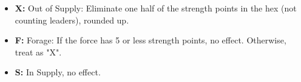 \begin{minipage}{\columnwidth}
  \begin{itemize}
    \item \textbf{X:} Out of Supply: Eliminate one half of the strength points in the hex (not counting leaders), rounded up.
    \item \textbf{F:} Forage: If the force has 5 or less strength points, no effect. Otherwise, treat as "X".
    \item \textbf{S:} In Supply, no effect.

  \end{itemize}
\end{minipage}
